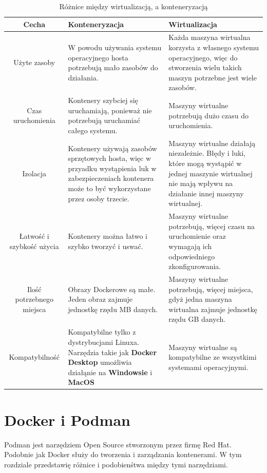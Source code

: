 \documentclass{iiuwb}
\begin{document}
\begin{table}[!h]
\caption{Różnice między wirtualizacją, a konteneryzacją}
\begin{center}
\begin{tabular}{| c |  p{5cm} | p{5cm} |}
\hline
Cecha  & Konteneryzacja & Wirtualizacja\\
\hline
\hline
Użyte zasoby & W powodu używania systemu operacyjnego hosta potrzebują mało zasobów do działania. & Każda maszyna wirtualna korzysta z własnego systemu operacyjnego, więc do stworzenia wielu takich maszyn potrzebne jest wiele zasobów. \\ \hline
Czas uruchomienia & Kontenery szybciej się uruchamiają, ponieważ nie potrzebują uruchamiać całego systemu. & Maszyny wirtualne potrzebują dużo czasu do uruchomienia.\\ \hline
Izolacja & Kontenery używają zasobów sprzętowych hosta, więc w przyadku wystąpienia luk w zabezpieczeniach kontenera może to być wykorzystane przez osoby trzecie. & Maszyny wirtualne działają niezależnie. Błędy i luki, które mogą wystąpić w jednej maszynie wirtualnej nie mają wpływu na działanie innej maszyny wirtualnej.\\ \hline
Łatwość i szybkość użycia & Kontenery można łatwo i szybko tworzyć i uswać.  & Maszyny wirtualne potrzebują, więcej czasu na uruchomienie oraz wymagają ich odpowiedniego zkonfigurowania.  \\ \hline
Ilość potrzebnego miejsca & Obrazy Dockerowe są małe. Jeden obraz zajmuje jednostkę rzędu MB danych.  & Maszyny wirtualne potrzebują, więcej miejsca, gdyż jedna maszyna wirtualna zajmuje jednostkę rzędu GB danych.  \\ \hline
Kompatybilność & Kompatybilne tylko z dystrybucjami Linuxa. Narzędzia takie jak \textbf{Docker Desktop} umożliwia działąnie na \textbf{Windowsie} i \textbf{MacOS} & Maszyny wirtualne są kompatybilne ze wszystkimi systemami operacyjnymi. \\ 
\hline
\end{tabular}
\label{tab:Różnice między konteneryzacją, a wirtualizacją}
\end{center}
\end{table}

\section{Docker i Podman}

Podman jest narzędziem Open Source stworzonym przez firmę Red Hat. Podobnie jak Docker służy do tworzenia i zarządzania kontenerami. W tym rozdziale przedstawię różnice i podobienśtwa między tymi narzędziami.
\end{document}
